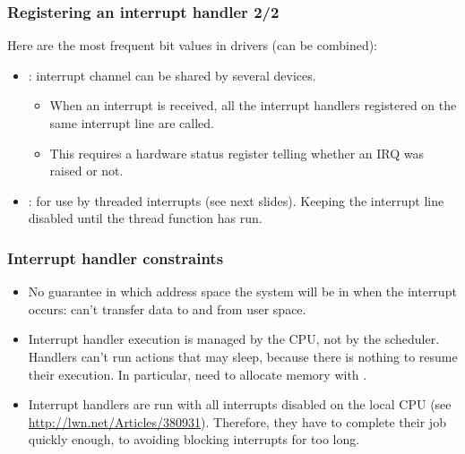 \begin{frame}
  \frametitle{Registering an interrupt handler 2/2}
  Here are the most frequent  bit values
  in drivers (can be combined):
  \begin{itemize}
     \item {}: interrupt channel can be shared by several devices.
     \begin{itemize}
	\item When an interrupt is received, all the interrupt
	handlers registered on the same interrupt line are called.
	\item This requires a hardware status register telling whether
        an IRQ was raised or not.
     \end{itemize}
     \item {}: for use by threaded interrupts (see
     next slides). Keeping the interrupt line disabled until the thread
     function has run.
  \end{itemize}
\end{frame}

\begin{frame}
  \frametitle{Interrupt handler constraints}
  \begin{itemize}
  \item No guarantee in which address space the system will be in when
    the interrupt occurs: can't transfer data to and from user space.
  \item Interrupt handler execution is managed by the CPU, not by the
    scheduler.  Handlers can't run actions that may sleep, because
    there is nothing to resume their execution. In particular, need to
    allocate memory with .
  \item Interrupt handlers are run with all interrupts disabled on
    the local CPU (see \url{http://lwn.net/Articles/380931}).
    Therefore, they have to complete their job quickly
    enough, to avoiding blocking interrupts for too long.
  \end{itemize}
\end{frame}

